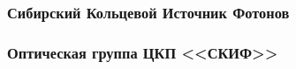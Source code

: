 \documentclass[14pt, hyperref = {colorlinks}]{beamer}
\begin{document}
\small
\begin{frame}
\frametitle{Сибирский Кольцевой Источник Фотонов}\label{t1}
\begin{figure}[h]
	\center{}
	\begin{minipage}[h]{0.75\linewidth}
	\end{minipage}
	
	\hfill
	\center{}
	\begin{minipage}[h]{0.75\linewidth}
	\end{minipage}
\end{figure}
\end{frame}

\small
\begin{frame}
\frametitle{Оптическая группа ЦКП <<СКИФ>>}\label{t1}
\begin{figure}[h]
\end{figure}
\end{frame}
\end{document}
